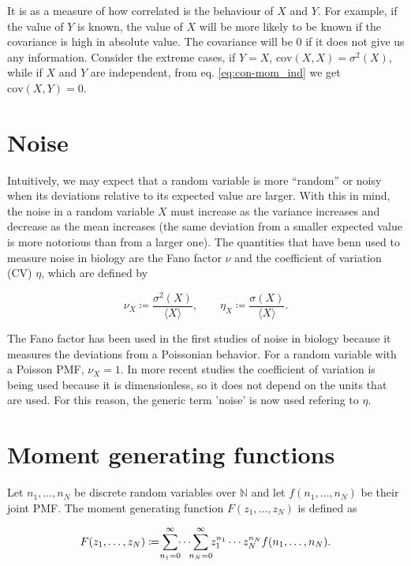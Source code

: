 It is as a measure of how correlated is the behaviour of $X$ and $Y$. For example, if the value of $Y$ is known, the value of $X$ will be more likely to be known if the covariance is high in absolute value. The covariance will be $0$ if it does not give us any information. Consider the extreme cases, if $Y=X$, $\text{cov}(X,X) = \sigma^2(X)$, while if $X$ and $Y$ are independent, from eq. \eqref{eq:con-mom_ind} we get $\text{cov}(X,Y) = 0$.

\section{Noise}
\label{sec:con-noise}
Intuitively, we may expect that a random variable is more ``random'' or noisy when its deviations relative to its expected value are larger. With this in mind, the noise in a random variable $X$ must increase as the variance increases and decrease as the mean increases (the same deviation from a smaller expected value is more notorious than from a larger one). The quantities that have benn used to measure noise in biology are the Fano factor $\nu$ and the coefficient of variation (CV) $\eta$, which are defined by

\begin{equation}
  \label{eq:con-fano_def}
  \nu_X \coloneqq \frac{\sigma^2(X)}{\langle X \rangle},\quad\quad\eta_X \coloneqq \frac{\sigma(X)}{\langle X \rangle}.
\end{equation}

The Fano factor has been used in the first studies of noise in biology because it measures the deviations from a Poissonian behavior. For a random variable with a Poisson PMF, $\nu_X=1$. In more recent studies the coefficient of variation is being used because it is dimensionless, so it does not depend on the units that are used. For this reason, the generic term 'noise' is now used refering to $\eta$.

\section{Moment generating functions}

Let $n_1,\dotsc,n_N$ be discrete random variables over $\mathbb{N}$ and let $f(n_1,\dotsc,n_N)$ be their joint PMF. The moment generating function $F(z_1,\dotsc,z_N)$ is defined as

\begin{equation}
  \label{def:mom_gen}
  F(z_1,\dotsc,z_N) \coloneqq \sum_{\mathclap{n_1=0}}^{\infty} \dotsi \sum_{\mathclap{n_N=0}}^{\infty} z_1^{n_1} \dotsm z_N^{n_N} f(n_1,\dotsc,n_N).
\end{equation}

